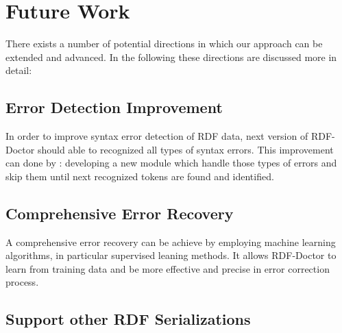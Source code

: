 \section{Future Work}

There exists a number of potential directions in which our approach can be extended and advanced. 
In the following these directions are discussed more in detail:   

\subsection{Error Detection Improvement}
In order to improve syntax error detection of RDF data, next version of RDF-Doctor should able to recognized all types of syntax errors. 
This improvement can done by : 
developing a new module which handle those types of errors and skip them until next recognized tokens are found and identified. 

\subsection{Comprehensive Error Recovery}

A comprehensive error recovery can be achieve by employing  machine learning algorithms, in particular supervised leaning methods.
It allows RDF-Doctor to learn from training data and be more effective and precise in error correction process.   

\subsection{Support other RDF Serializations }

